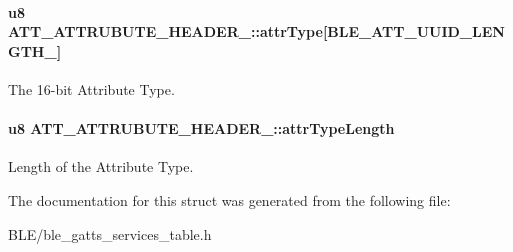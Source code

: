 \paragraph[{\texorpdfstring{attr\+Type}{attrType}}]{\setlength{\rightskip}{0pt plus 5cm}u8 A\+T\+T\+\_\+\+A\+T\+T\+R\+U\+B\+U\+T\+E\+\_\+\+H\+E\+A\+D\+E\+R\+\_\+::attr\+Type\mbox{[}{\bf B\+L\+E\+\_\+\+A\+T\+T\+\_\+\+U\+U\+I\+D\+\_\+\+L\+E\+N\+G\+T\+H\+\_}\mbox{]}}\hypertarget{struct_a_t_t___a_t_t_r_u_b_u_t_e___h_e_a_d_e_r__2_afe16e21cd13d9e06ee84b4ab62b43ba3}{}\label{struct_a_t_t___a_t_t_r_u_b_u_t_e___h_e_a_d_e_r__2_afe16e21cd13d9e06ee84b4ab62b43ba3}
The 16-\/bit Attribute Type. 
\paragraph[{\texorpdfstring{attr\+Type\+Length}{attrTypeLength}}]{\setlength{\rightskip}{0pt plus 5cm}u8 A\+T\+T\+\_\+\+A\+T\+T\+R\+U\+B\+U\+T\+E\+\_\+\+H\+E\+A\+D\+E\+R\+\_\+::attr\+Type\+Length}\hypertarget{struct_a_t_t___a_t_t_r_u_b_u_t_e___h_e_a_d_e_r__2_ab431c87312aa49c3a56bc687e311c70c}{}\label{struct_a_t_t___a_t_t_r_u_b_u_t_e___h_e_a_d_e_r__2_ab431c87312aa49c3a56bc687e311c70c}
Length of the Attribute Type. 

The documentation for this struct was generated from the following file\+:\begin{DoxyCompactItemize}
\item 
B\+L\+E/ble\+\_\+gatts\+\_\+services\+\_\+table.\+h\end{DoxyCompactItemize}
